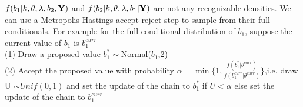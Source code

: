\documentclass[11pt]{article}
\begin{document}
$f(b_1 | k,\theta,\lambda,b_2, {\bf Y})$ and $f(b_2 |
k,\theta,\lambda,b_1| {\bf Y})$ are not any recognizable densities. We
can use a Metropolis-Hastings accept-reject step to sample from their
full conditionals. For example for the full conditional distribution of $b_1$, suppose the current value of $b_1$ is $b_1^{curr}$\\
(1) Draw a proposed value $b_1^* \sim
$Normal($b_1$,2)\\ %
(2) Accept the proposed value with probability $\alpha=\min\{1,
\frac{f(b_1^*|\theta^{curr})}{f(b_1^{curr}|\theta^{curr})} \}$,i.e.
draw U $\sim Unif(0,1)$ and set the update of the chain to $b_1^*$ if
$U<\alpha$ else set the update of the chain to $b_1^{curr}$
\end{document}

